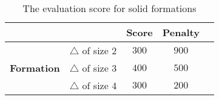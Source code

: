 \begin{table}[ht]
\centering
	\begin{tabular}{llccc}
		\cline{3-4}
		\multicolumn{1}{c}{} & \multicolumn{1}{c}{\normalsize } & \multicolumn{1}{|c}{\normalsize Score} & \multicolumn{1}{c|}{\normalsize Penalty} \\
		\hline
		\multicolumn{1}{|c|}{\multirow{3}{*}{\textbf{\normalsize Formation}}} & \multicolumn{1}{c}{\normalsize $\triangle$ of size 2} & \multicolumn{1}{|c}{$300$} & \multicolumn{1}{c|}{\normalsize $900$} \\
		\multicolumn{1}{|c|}{} & \multicolumn{1}{c}{\normalsize $\triangle$ of size 3} & \multicolumn{1}{|c}{$400$} & \multicolumn{1}{c|}{\normalsize $500$} \\
		\multicolumn{1}{|c|}{} & \multicolumn{1}{c}{\normalsize $\triangle$ of size 4} & \multicolumn{1}{|c}{$300$} & \multicolumn{1}{c|}{\normalsize $200$} \\
		\hline
	\end{tabular}
	\caption{The evaluation score for solid formations}
	\label{tab:evaluationsolidformations}
\end{table}